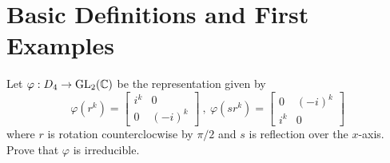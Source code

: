 \chapter{Basic Definitions and First Examples}

\begin{exercise}
    Let $\varphi : D_4 \to \text{GL}_{2}(\mathbb{C})$ be the representation given by 
    $$\varphi(r^k) = \begin{bmatrix}i^k & 0 \\ 0 & (-i)^k\end{bmatrix} \ , \ \varphi(sr^k) = \begin{bmatrix}0 & (-i)^k \\ i^k & 0 \end{bmatrix}$$
    where $r$ is rotation counterclocwise by $\pi/2$ and $s$ is reflection over the $x$-axis. Prove that $\varphi$ is irreducible. \\
\end{exercise}

